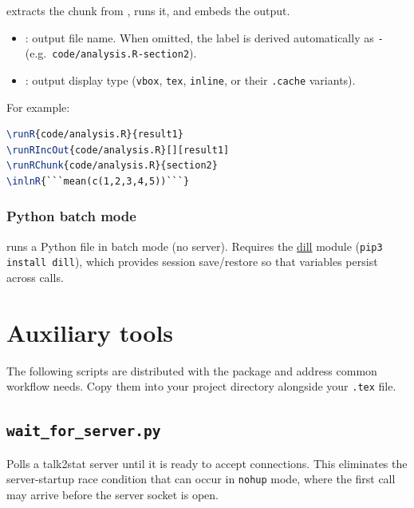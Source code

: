 \documentclass{ltxdoc}
\newcommand{\pkg}[1]{\textsf{#1}}
\newcommand{\opt}[1]{\texttt{#1}}
\newcommand{\file}[1]{\texttt{#1}}
\begin{document}
\DescribeMacro{\runLANGChunk}
extracts the chunk  from , runs it, and embeds the
output.
\begin{itemize}
  \item {}: output file name.  When omitted, the label is
    derived automatically as \texttt{-}
    (e.g.\ \texttt{code/analysis.R-section2}).
  \item {}: output display type (\texttt{vbox}, \texttt{tex},
    \texttt{inline}, or their \texttt{.cache} variants).
\end{itemize}

For example:
\begin{lstlisting}[language=tex]
\runR{code/analysis.R}{result1}
\runRIncOut{code/analysis.R}[][result1]
\runRChunk{code/analysis.R}{section2}
\inlnR{```mean(c(1,2,3,4,5))```}
\end{lstlisting}

\subsubsection{Python batch mode}

\DescribeMacro{\runPythonBatch}
runs a Python file in batch mode (no server).  Requires the
\href{https://pypi.org/project/dill/}{dill} module
(\texttt{pip3 install dill}), which provides session save/restore
so that variables persist across calls.

\section{Auxiliary tools}
\label{sec:tools}

The following scripts are distributed with the package and address
common workflow needs.  Copy them into your project directory alongside
your \texttt{.tex} file.

\subsection{\file{wait\_for\_server.py}}

Polls a \pkg{talk2stat} server until it is ready to accept connections.
This eliminates the server-startup race condition that can occur in
\opt{nohup} mode, where the first  call may arrive before the
server socket is open.
\end{document}
